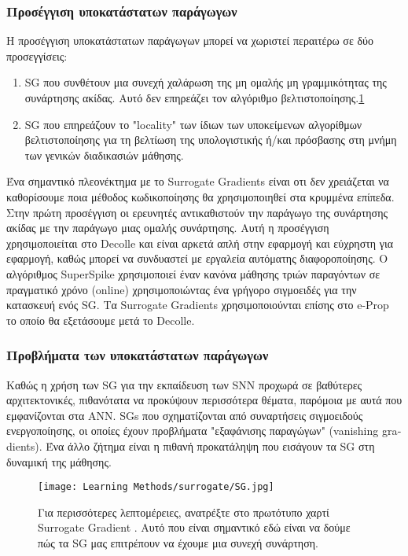 \documentclass[12pt]{report}
\begin{document}
\subsubsection{Προσέγγιση υποκατάστατων παράγωγων}
Η προσέγγιση υποκατάστατων παράγωγων μπορεί να χωριστεί περαιτέρω σε δύο προσεγγίσεις:
\begin{enumerate}
    \item \textlatin{SG} που συνθέτουν μια συνεχή χαλάρωση
της μη ομαλής μη γραμμικότητας της συνάρτησης ακίδας. Αυτό δεν επηρεάζει τον αλγόριθμο βελτιστοποίησης.\ref{fig:sg}
    \item \textlatin{SG} που επηρεάζουν το "\textlatin{locality}" των ίδιων των υποκείμενων αλγορίθμων βελτιστοποίησης για τη βελτίωση της υπολογιστικής ή/και πρόσβασης στη μνήμη των γενικών διαδικασιών μάθησης.
\end{enumerate}
Ένα σημαντικό πλεονέκτημα με το Surrogate Gradients είναι οτι δεν χρειάζεται να καθορίσουμε ποια μέθοδος κωδικοποίησης θα χρησιμοποιηθεί στα κρυμμένα επίπεδα. Στην πρώτη προσέγγιση οι ερευνητές  αντικαθιστούν την παράγωγο της συνάρτησης ακίδας με την παράγωγο μιας ομαλής συνάρτησης. Αυτή η προσέγγιση χρησιμοποιείται στο \textlatin{Decolle} και είναι αρκετά απλή στην εφαρμογή και εύχρηστη για εφαρμογή, καθώς μπορεί να συνδυαστεί με εργαλεία αυτόματης διαφοροποίησης. Ο αλγόριθμος \textlatin{SuperSpike} χρησιμοποιεί έναν κανόνα μάθησης τριών παραγόντων σε πραγματικό χρόνο (\textlatin{online}) χρησιμοποιώντας ένα γρήγορο σιγμοειδές για την κατασκευή ενός \textlatin{SG}. Τα Surrogate Gradients χρησιμοποιούνται επίσης στο \textlatin{e-Prop} το οποίο θα εξετάσουμε μετά το \textlatin{Decolle}.
\subsubsection{Προβλήματα των υποκατάστατων παράγωγων}

Καθώς η χρήση των \textlatin{SG} για την εκπαίδευση των \textlatin{SNN} προχωρά σε βαθύτερες αρχιτεκτονικές, πιθανότατα να προκύψουν περισσότερα θέματα, παρόμοια με αυτά που εμφανίζονται στα \textlatin{ANN}. SGs που σχηματίζονται από συναρτήσεις σιγμοειδούς ενεργοποίησης, οι οποίες έχουν προβλήματα "εξαφάνισης παραγώγων" (\textlatin{vanishing gradients}). Ένα άλλο ζήτημα είναι η πιθανή προκατάληψη που εισάγουν τα \textlatin{SG} στη δυναμική της μάθησης.

\begin{figure}[htp]
    \centering
    \texttt{[image: Learning Methods/surrogate/SG.jpg]}
    \caption{Για περισσότερες λεπτομέρειες, ανατρέξτε στο πρωτότυπο χαρτί Surrogate Gradient \cite{Neftci2019}. Αυτό που είναι σημαντικό εδώ είναι να δούμε πώς τα \textlatin{SG} μας επιτρέπουν να έχουμε μια συνεχή συνάρτηση.}
    \label{fig:sg}
\end{figure}
\end{document}
